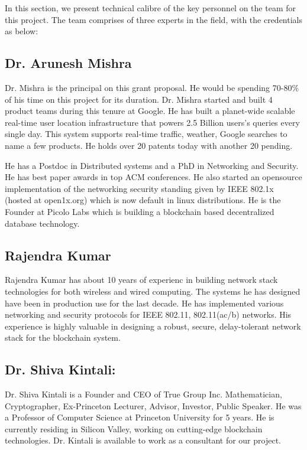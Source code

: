 \label{sec:pers}
In this section, we present technical calibre of the key personnel on the team for this project. The team comprises of
three experts in the field, with the credentials as below:

\subsection*{Dr. Arunesh Mishra}

Dr. Mishra is the principal on this grant proposal. He would be spending 70-80\% of his time on this project for its
duration. Dr. Mishra started and built 4 product teams during this tenure at Google. He has built a planet-wide scalable
real-time user location infrastructure that powers 2.5 Billion users's queries every single day. This system supports
real-time traffic, weather, Google searches to name a few products. He holds over 20 patents today with another 20
pending. 

He has a Postdoc in Distributed systems and a PhD in Networking and Security. He has best paper awards in top ACM
conferences. He also started an opensource implementation of the networking security standing given by IEEE 802.1x
(hosted at open1x.org) which is now default in linux distributions. He is the Founder at Picolo Labs which is building a
blockchain based decentralized database technology.

\subsection*{Rajendra Kumar}

Rajendra Kumar has about 10 years of experienc in building network stack technologies for both wireless and wired
computing. The systems he has designed have been in production use for the last decade. He has implemented various
networking and security protocols for IEEE 802.11, 802.11(ac/b) networks. His experience is highly valuable in designing
a robust, secure, delay-tolerant network stack for the blockchain system.

\subsection*{Dr. Shiva Kintali:} 
Dr. Shiva Kintali is a Founder and CEO of True Group Inc. Mathematician, Cryptographer, Ex-Princeton Lecturer, Advisor,
Investor, Public Speaker. He was a Professor of Computer Science at Princeton University for 5 years. He is currently
residing in Silicon Valley, working on cutting-edge blockchain technologies. Dr. Kintali is available to work as a
consultant for our project.

